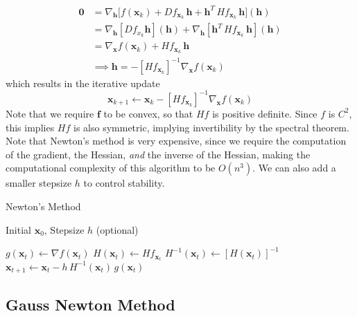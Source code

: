   \begin{align*}
    \mathbf{0} & = \nabla_\mathbf{h} \big[ f(\mathbf{x}_k) + D f_{\mathbf{x}_k} \, \mathbf{h} + \mathbf{h}^T \, H f_{\mathbf{x}_k} \, \mathbf{h} \big] (\mathbf{h}) \\
    & = \nabla_\mathbf{h} [ D f_{x_k} \mathbf{h} ] (\mathbf{h}) + \nabla_\mathbf{h} [\mathbf{h}^T \, H f_{\mathbf{x}_k} \, \mathbf{h}] (\mathbf{h}) \\
    & = \nabla_\mathbf{x} f(\mathbf{x}_k) + H f_{\mathbf{x}_k} \, \mathbf{h} \\
    & \implies \mathbf{h} = - [H f_{\mathbf{x}_k}]^{-1} \nabla_\mathbf{x} f(\mathbf{x}_k) 
  \end{align*}
  which results in the iterative update 
  \begin{equation}
    \mathbf{x}_{k+1} \gets \mathbf{x}_k - [H f_{\mathbf{x}_k}]^{-1} \nabla_\mathbf{x} f (\mathbf{x}_k)
  \end{equation}
  Note that we require $\mathbf{f}$ to be convex, so that $H f$ is positive definite. Since $f$ is $C^2$, this implies $H f$ is also symmetric, implying invertibility by the spectral theorem. Note that Newton's method is very expensive, since we require the computation of the gradient, the Hessian, \textit{and} the inverse of the Hessian, making the computational complexity of this algorithm to be $O(n^3)$. We can also add a smaller stepsize $h$ to control stability. 

  \begin{algorithm}
    \caption{Newton's Method}\label{alg:netwons}
    \begin{algorithmic}

    \Require Initial $\mathbf{x}_0$, Stepsize $h$ (optional)

        \State $g(\mathbf{x}_t) \gets \nabla f(\mathbf{x}_t)$  
        \State $H(\mathbf{x}_t) \gets H f_{\mathbf{x}_t}$ 
        \State $H^{-1} (\mathbf{x}_t) \gets [H(\mathbf{x}_t)]^{-1}$ 
        \State $\mathbf{x}_{t+1} \gets \mathbf{x}_t - h \, H^{-1} (\mathbf{x}_t) \, g(\mathbf{x}_t)$
    \EndFor

    \end{algorithmic}
  \end{algorithm}

\subsection{Gauss Newton Method}

